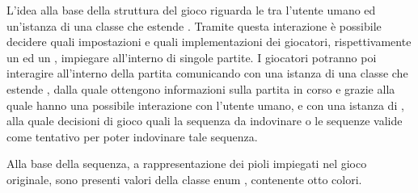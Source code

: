 \documentclass[letterpaper,10pt,italian]{sphinxmanual}
\begin{document}
L’idea alla base della struttura del gioco riguarda le  tra l’utente umano ed un’istanza
di una classe che estende . Tramite questa interazione è possibile decidere quali impostazioni
e quali implementazioni dei giocatori, rispettivamente un  ed un ,
impiegare all’interno di singole partite. I giocatori potranno poi interagire all’interno della partita
comunicando con una istanza di una classe che estende , dalla quale ottengono informazioni
sulla partita in corso e grazie alla quale hanno una possibile interazione con l’utente umano, e con
una istanza di , alla quale  decisioni di gioco quali la sequenza da indovinare o le sequenze
valide come tentativo per poter indovinare tale sequenza.

Alla base della sequenza, a rappresentazione dei pioli impiegati nel gioco originale, sono presenti valori della
classe enum , contenente otto colori.
\end{document}
